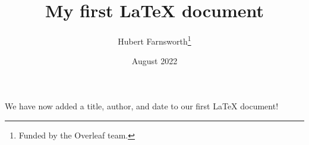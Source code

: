 \documentclass[12pt, letterpaper]{article}
\title{My first LaTeX document}
\author{Hubert Farnsworth\thanks{Funded by the Overleaf team.}}
\date{August 2022}
\begin{document}
\maketitle
We have now added a title, author, and date to our first \LaTeX{} document!

\end{document}

